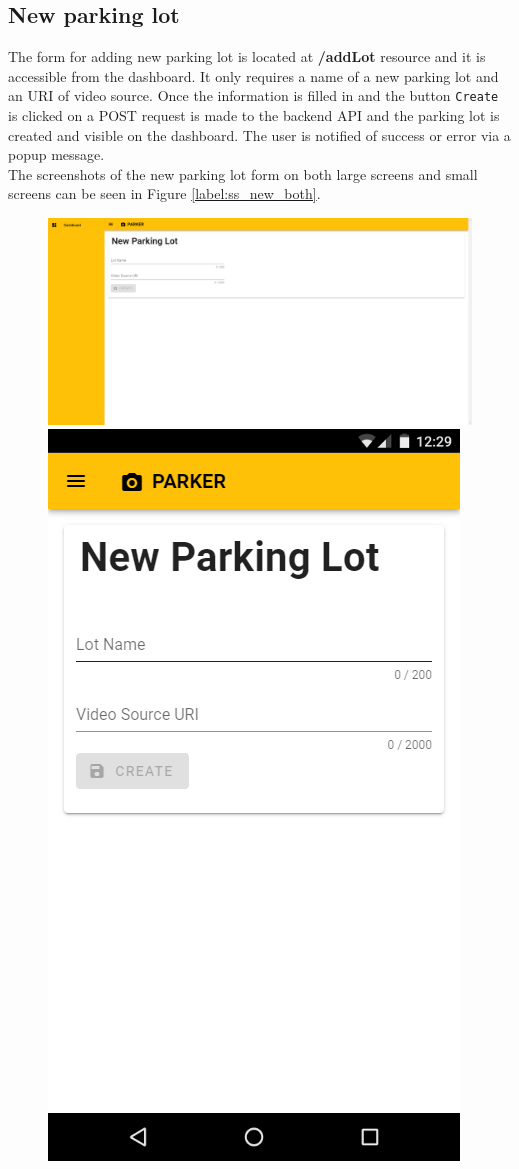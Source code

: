 \documentclass[thesis=M,english]{FITthesis}[2019/03/06]
\begin{document}
\subsection{New parking lot}
The form for adding new parking lot is located at \textbf{/addLot} resource and it is accessible from the dashboard. It only requires a name of a new parking lot and an URI of video source. Once the information is filled in and the button \texttt{Create} is clicked on a POST request is made to the backend API and the parking lot is created and visible on the dashboard. The user is notified of success or error via a popup message.\\

The screenshots of the new parking lot form on both large screens and small screens can be seen in Figure \ref{label:ss_new_both}.
\begin{figure}[ht!]
	\centering
	\includegraphics[scale=0.25]{imgs/ss-new.png}
	\includegraphics[scale=0.5]{imgs/ss-new-mobile.png}

\end{figure}
\end{document}
